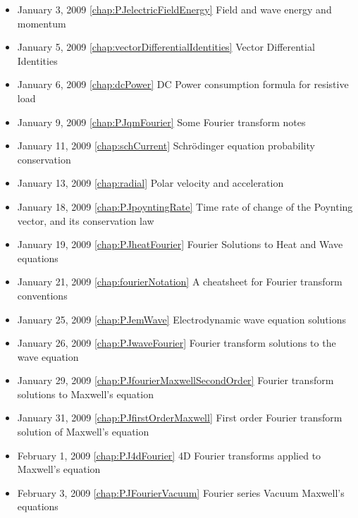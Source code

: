 \begin{itemize}
\item January 3, 2009 \ref{chap:PJelectricFieldEnergy} Field and wave energy and momentum

\item January 5, 2009 \ref{chap:vectorDifferentialIdentities} Vector Differential Identities

\item January 6, 2009 \ref{chap:dcPower} DC Power consumption formula for resistive load

\item January 9, 2009 \ref{chap:PJqmFourier} Some Fourier transform notes

\item January 11, 2009 \ref{chap:schCurrent} Schr\"{o}dinger equation probability conservation

\item January 13, 2009 \ref{chap:radial} Polar velocity and acceleration

\item January 18, 2009 \ref{chap:PJpoyntingRate} Time rate of change of the Poynting vector, and its conservation law

\item January 19, 2009 \ref{chap:PJheatFourier} Fourier Solutions to Heat and Wave equations

\item January 21, 2009 \ref{chap:fourierNotation} A cheatsheet for Fourier transform conventions

\item January 25, 2009 \ref{chap:PJemWave} Electrodynamic wave equation solutions

\item January 26, 2009 \ref{chap:PJwaveFourier} Fourier transform solutions to the wave equation

\item January 29, 2009 \ref{chap:PJfourierMaxwellSecondOrder} Fourier transform solutions to Maxwell's equation

\item January 31, 2009 \ref{chap:PJfirstOrderMaxwell} First order Fourier transform solution of Maxwell's equation

\item February 1, 2009 \ref{chap:PJ4dFourier} 4D Fourier transforms applied to Maxwell's equation

\item February 3, 2009 \ref{chap:PJFourierVacuum} Fourier series Vacuum Maxwell's equations


\end{itemize}
